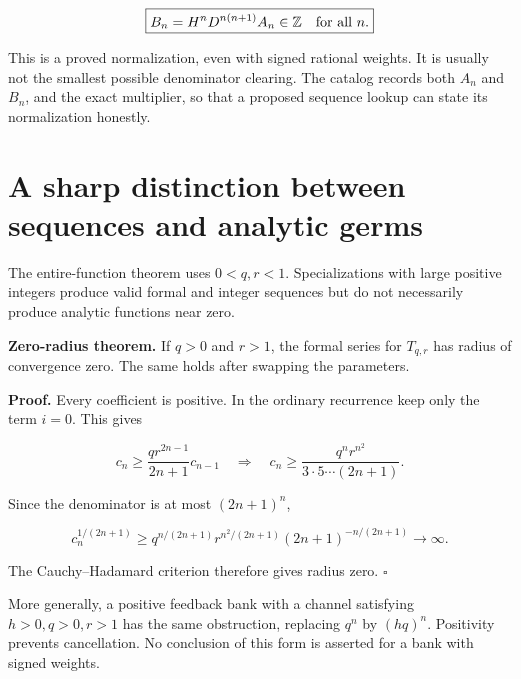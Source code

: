 \[
\boxed{B_n=H^nD^{n(n+1)}A_n\in\mathbb Z\quad\hbox{for all }n.}
\]

This is a proved normalization, even with signed rational weights. It is
usually not the smallest possible denominator clearing. The catalog
records both \(A_n\) and \(B_n\), and the exact multiplier, so that a
proposed sequence lookup can state its normalization honestly.

\hypertarget{a-sharp-distinction-between-sequences-and-analytic-germs}{%
\section{A sharp distinction between sequences and analytic
germs}\label{a-sharp-distinction-between-sequences-and-analytic-germs}}

The entire-function theorem uses \(0<q,r<1\). Specializations with large
positive integers produce valid formal and integer sequences but do not
necessarily produce analytic functions near zero.

\textbf{Zero-radius theorem.} If \(q>0\) and \(r>1\), the formal series
for \(T_{q,r}\) has radius of convergence zero. The same holds after
swapping the parameters.

\textbf{Proof.} Every coefficient is positive. In the ordinary
recurrence keep only the term \(i=0\). This gives

\[
c_n\ge\frac{q r^{2n-1}}{2n+1}c_{n-1}
\quad\Longrightarrow\quad
c_n\ge\frac{q^n r^{n^2}}{3\cdot5\cdots(2n+1)}.
\]

Since the denominator is at most \((2n+1)^n\),

\[
c_n^{1/(2n+1)}\ge
q^{n/(2n+1)}r^{n^2/(2n+1)}(2n+1)^{-n/(2n+1)}\longrightarrow\infty.
\]

The Cauchy--Hadamard criterion therefore gives radius zero. \(\square\)

More generally, a positive feedback bank with a channel satisfying
\(h>0,q>0,r>1\) has the same obstruction, replacing \(q^n\) by
\((hq)^n\). Positivity prevents cancellation. No conclusion of this form
is asserted for a bank with signed weights.

